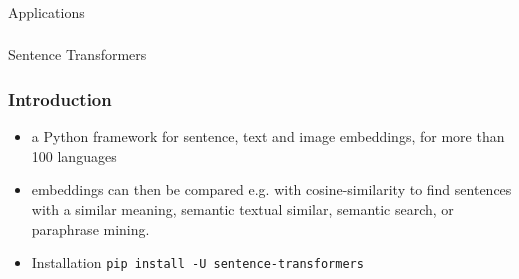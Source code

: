 \begin{frame}[fragile]\frametitle{}
\begin{center}
{\Large Applications}
\end{center}
\end{frame}

\begin{frame}[fragile]\frametitle{}
\begin{center}
{\Large Sentence Transformers}

\end{center}
\end{frame}

\begin{frame}[fragile]\frametitle{Introduction}

\begin{itemize}
\item  a Python framework for sentence, text and image embeddings, for more than 100 languages
\item  embeddings can then be compared e.g. with cosine-similarity to find sentences with a similar meaning, semantic textual similar, semantic search, or paraphrase mining.
\item Installation \lstinline|pip install -U sentence-transformers|
\end{itemize}



\end{frame}


